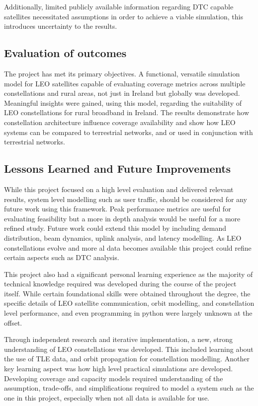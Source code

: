 Additionally, limited publicly available information regarding DTC capable satellites necessitated assumptions in order to achieve a viable simulation, this introduces uncertainty to the results. 

\subsection{Evaluation of outcomes}
The project has met its primary objectives. A functional, versatile simulation model for LEO satellites capable of evaluating coverage metrics across multiple constellations and rural areas, not just in Ireland but globally was developed. Meaningful insights were gained, using this model, regarding the suitability of LEO constellations for rural broadband in Ireland. The results demonstrate how constellation architecture influence coverage availability and show how LEO systems can be compared to terrestrial networks, and or used in conjunction with terrestrial networks. 

\subsection{Lessons Learned and Future Improvements}
While this project focused on a high level evaluation and delivered relevant results, system level modelling such as user traffic, should be considered for any future work using this framework. Peak performance metrics are useful for evaluating feasibility but a more in depth analysis would be useful for a more refined study. Future work could extend this model by including demand distribution, beam dynamics, uplink analysis, and latency modelling. As LEO constellations evolve and more al data becomes available this project could refine certain aspects such as DTC analysis. 

This project also had a significant personal learning experience as the majority of technical knowledge required was developed during the course of the project itself. While certain foundational skills were obtained throughout the degree, the specific details of LEO satellite communication, orbit modelling, and constellation level performance, and even programming in python were largely unknown at the offset. 

Through independent research and iterative implementation, a new, strong understanding of LEO constellations was developed. This included learning about the use of TLE data, and orbit propagation for constellation modelling. Another key learning aspect was how high level practical simulations are developed. Developing coverage and capacity models required understanding of the assumption, trade-offs, and simplifications required to model a system such as the one in this project, especially when not all data is available for use. 

